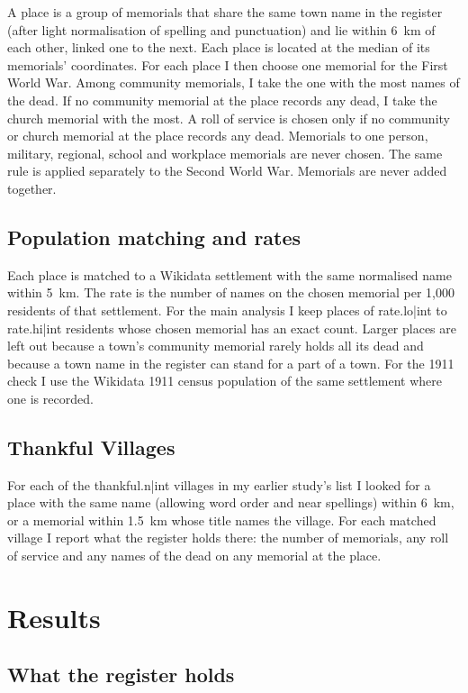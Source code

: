 \documentclass[11pt,a4paper]{article}
\begin{document}
A place is a group of memorials that share the same town name in the register (after light normalisation of spelling and punctuation) and lie within 6~km of each other, linked one to the next. Each place is located at the median of its memorials' coordinates. For each place I then choose one memorial for the First World War. Among community memorials, I take the one with the most names of the dead. If no community memorial at the place records any dead, I take the church memorial with the most. A roll of service is chosen only if no community or church memorial at the place records any dead. Memorials to one person, military, regional, school and workplace memorials are never chosen. The same rule is applied separately to the Second World War. Memorials are never added together.

\subsection{Population matching and rates}

Each place is matched to a Wikidata settlement with the same normalised name within 5~km. The rate is the number of names on the chosen memorial per 1,000 residents of that settlement. For the main analysis I keep places of {{rate.lo|int}} to {{rate.hi|int}} residents whose chosen memorial has an exact count. Larger places are left out because a town's community memorial rarely holds all its dead and because a town name in the register can stand for a part of a town. For the 1911 check I use the Wikidata 1911 census population of the same settlement where one is recorded.

\subsection{Thankful Villages}

For each of the {{thankful.n|int}} villages in my earlier study's list I looked for a place with the same name (allowing word order and near spellings) within 6~km, or a memorial within 1.5~km whose title names the village. For each matched village I report what the register holds there: the number of memorials, any roll of service and any names of the dead on any memorial at the place.

\section{Results}

\subsection{What the register holds}
\end{document}
